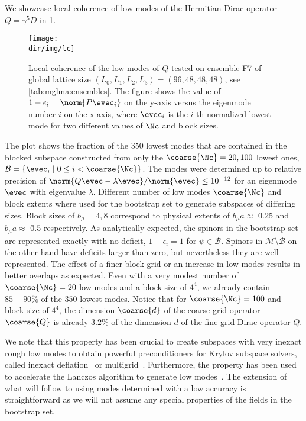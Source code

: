We showcase local coherence of low modes of the Hermitian Dirac operator $Q = \gamma^{5} D$ in \cref{fig:lc}.
\begin{figure}
    \centering
    \texttt{[image: \\dir/img/lc]}
    \caption{Local coherence of the low modes of $Q$ tested on ensemble F7 of global lattice size $(L_0,L_1,L_2,L_3) = (96, 48, 48, 48)$, see \cref{tab:mglma:ensembles}. The figure shows the value of $1 - \epsilon_i = \norm{P \evec_i}$ on the y-axis versus the eigenmode number $i$ on the x-axis, where $\evec_i$ is the $i$-th normalized lowest mode for two different values of $\Nc$ and block sizes. \takenfull }
    \label{fig:lc}
\end{figure}
The plot shows the fraction of the \num{350} lowest modes that are contained in the blocked subspace constructed from only the $\coarse{\Nc} = 20, 100$ lowest ones, $\mathcal{B} = \{ \evec_i \mid 0 \leq i < \coarse{\Nc} \}$.
The modes were determined up to relative precision of $\norm{Q \evec - \lambda \evec}/\norm{\evec} \leq 10^{-12}$ for an eigenmode $\evec$ with eigenvalue $\lambda$.
Different number of low modes $\coarse{\Nc}$ and block extents where used for the bootstrap set to generate subspaces of differing sizes.
Block sizes of $b_{\mu} = 4, 8$ correspond to physical extents of $b_{\mu} a \approx $ \u{0.25}{\femto\metre} and $b_{\mu} a \approx $ \u{0.5}{\femto\metre} respectively.
As analytically expected, the spinors in the bootstrap set are represented exactly with no deficit, \ie $1 - \epsilon_i = 1$ for $\psi \in \mathcal{B}$.
Spinors in $\mathcal{M} \setminus \mathcal{B}$ on the other hand have deficits larger than zero, but nevertheless they are well represented.
The effect of a finer block grid or an increase in low modes results in better overlaps as expected.
Even with a very modest number of $\coarse{\Nc}=20$ low modes and a block size of $4^4$, we already contain $85-90\%$ of the $350$ lowest modes.
Notice that for $\coarse{\Nc}=100$ and block size of $4^4$, the dimension $\coarse{d}$ of the coarse-grid operator $\coarse{Q}$ is already $3.2\%$ of the dimension $d$ of the fine-grid Dirac operator $Q$.

We note that this property has been crucial to create subspaces with very inexact rough low modes to obtain powerful preconditioners for Krylov subspace solvers, called inexact deflation~\cite{Luescher2007} or multigrid~\cite{Babich:2010qb}.
Furthermore, the property has been used to accelerate the Lanczos algorithm to generate low modes~\cite{Clark_2018}.
The extension of what will follow to using modes determined with a low accuracy is straightforward as we will not assume any special properties of the fields in the bootstrap set.

